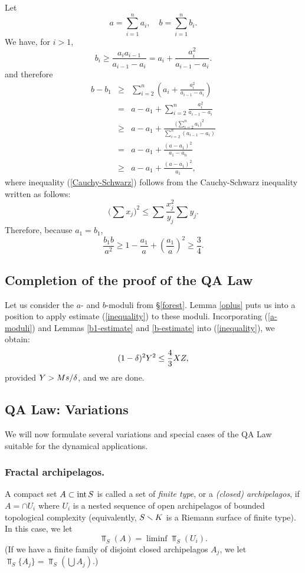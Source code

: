 \begin{pf} 
Let 
$$
a = \sum_{i=1}^n a_i, \quad b = \sum_{i=1}^n b_i.
$$
We have, for $i > 1$,
$$
b_i \ge \frac{a_ia_{i-1}}{a_{i-1}-a_i} = a_i + \frac{a_i^2}{a_{i-1} - a_i}.
$$
and therefore
\begin{eqnarray}
b - b_1 &\ge& \sum_{i = 2}^n  \left( a_i + \frac{a_i^2}{a_{i-1} - a_i} \right) \nonumber\\
&=&
a - a_1 + \sum_{i=2}^n \frac{a_i^2}{a_{i-1} - a_i} \nonumber\\
&\ge& \label{Cauchy-Schwarz}
a - a_1 + \frac{\big(\sum_{i=2}^n a_i \big)^2}{\sum_{i=2}^n (a_{i-1} - a_i) } \\ 
&=&
a - a_1 + \frac{(a-a_1)^2}{a_1 - a_n} \nonumber \\
&\ge&
a - a_1 + \frac{(a - a_1)^2}{a_1},  \nonumber
\end{eqnarray}
where inequality (\ref{Cauchy-Schwarz}) follows from the Cauchy-Schwarz inequality written as follows:
$$
\big(\sum x_j\big)^2 \le \sum \frac{x_j^2}{y_j} \sum y_j.
$$
Therefore, because $a_1 = b_1$,
$$
\frac{b_1 b}{a^2} \ge 1 - \frac {a_1} {a} + \left( \frac {a_1} {a} \right)^2 \ge \frac34.
$$

\end{pf}



  \subsection{Completion of the proof of the QA Law}
Let us consider the $a$- and $b$-moduli from  \S \ref{forest}. 
Lemma  \ref{oplus} puts us into a position to apply  estimate (\ref{inequality})
to these moduli.
Incorporating (\ref{a-moduli}) and Lemmas  \ref{b1-estimate} and \ref{b-estimate} into (\ref{inequality}),
we obtain:
$$
   (1-{\delta})^2 Y^2  \leq     \frac{4}{3} XZ,    
$$
provided $Y> Ms/{\delta}$, and we are done.
\QED


\subsection{QA Law: Variations}\label{variation}
We will now formulate several variations and special cases of the QA Law
suitable for the dynamical applications. 

\subsubsection { Fractal archipelagos.}  \label{fractal}
A compact set $A \subset \operatorname{int} S$ is called a set of {\it finite type},
or a {\it (closed) archipelagos}, if $A = \cap U_i$
where $U_i$ is a nested sequence of open archipelagos of bounded topological complexity
(equivalently, $S\smallsetminus K$ is a Riemann surface of finite type).
In this case, we let
$$
    \Top_S(A)= \liminf \Top_S(U_i).
$$  
(If we have a finite family of disjoint closed archipelagos $A_j$,
we let $\Top_S \{A_j\} = \Top_S(\bigcup A_j)$.) 


